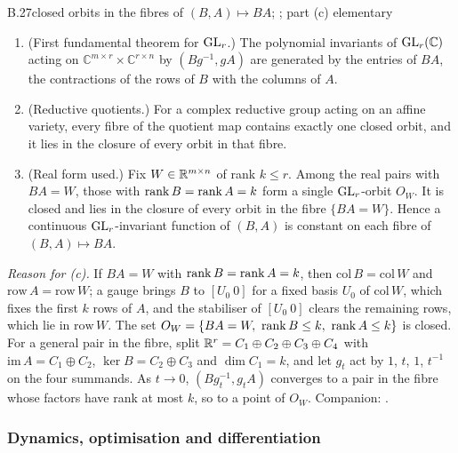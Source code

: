 \begin{auxresult}{B.27}{closed orbits in the fibres of $(B,A)\mapsto BA$}{\citep[Ch.~5]{xgoodman2009symmetry};
\citep[Ch.~1]{xmumford1994geometric}; part (c) elementary}
\begin{enumerate}[label=(\alph*)]
  \item (First fundamental theorem for $\mathrm{GL}_r$.) The polynomial invariants of $\mathrm{GL}_r(\mathbb C)$ acting on
    $\mathbb C^{m\times r}\times\mathbb C^{r\times n}$ by $(Bg^{-1},gA)$ are generated by the entries of $BA$, the
    contractions of the rows of $B$ with the columns of $A$.
  \item (Reductive quotients.) For a complex reductive group acting on an affine variety, every fibre of the quotient
    map contains exactly one closed orbit, and it lies in the closure of every orbit in that fibre.
  \item (Real form used.) Fix $W\in\mathbb{R}^{m\times n}$ of rank $k\le r$. Among the real pairs with $BA=W$, those with
    $\operatorname{rank} B=\operatorname{rank} A=k$ form a single $\mathrm{GL}_r$-orbit $O_W$. It is closed and lies in the closure of every orbit in the fibre
    $\{BA=W\}$. Hence a continuous $\mathrm{GL}_r$-invariant function of $(B,A)$ is constant on each fibre of $(B,A)\mapsto BA$.
\end{enumerate}
\end{auxresult}
\noindent\emph{Reason for (c).} If $BA=W$ with $\operatorname{rank} B=\operatorname{rank} A=k$, then $\mathrm{col}\,B=\mathrm{col}\,W$ and
$\mathrm{row}\,A=\mathrm{row}\,W$; a gauge brings $B$ to $[U_0\ 0]$ for a fixed basis $U_0$ of $\mathrm{col}\,W$, which
fixes the first $k$ rows of $A$, and the stabiliser of $[U_0\ 0]$ clears the remaining rows, which lie in
$\mathrm{row}\,W$. The set $O_W=\{BA=W,\ \operatorname{rank} B\le k,\ \operatorname{rank} A\le k\}$ is closed. For a general pair in the fibre, split
$\mathbb{R}^r=C_1\oplus C_2\oplus C_3\oplus C_4$ with $\mathrm{im}\,A=C_1\oplus C_2$, $\ker B=C_2\oplus C_3$ and $\dim C_1=k$,
and let $g_t$ act by $1$, $t$, $1$, $t^{-1}$ on the four summands. As $t\to0$, $(Bg_t^{-1},g_tA)$ converges to a pair in
the fibre whose factors have rank at most $k$, so to a point of $O_W$. Companion: .

\subsubsection{Dynamics, optimisation and differentiation}

